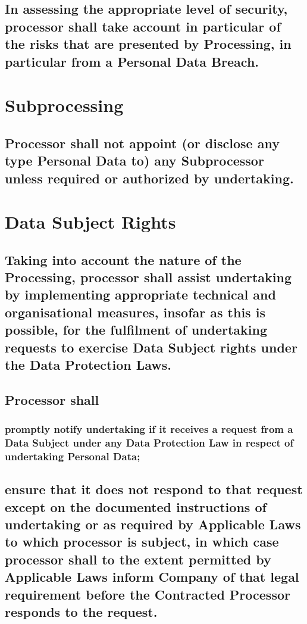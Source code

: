 \documentclass[a4paper]{article}
\begin{document}
\subsection{In assessing the appropriate level of security, \gls{processor} shall take account in particular of the risks that are presented by Processing, in particular from a Personal Data Breach.}

\section{Subprocessing}

\subsection{Processor shall not appoint (or disclose any \gls{type} Personal Data to) any Subprocessor unless required or authorized by \gls{undertaking}.}

\section{Data Subject Rights}

\subsection{Taking into account the nature of the Processing, \gls{processor} shall assist \gls{undertaking} by implementing appropriate technical and organisational measures, insofar as this is possible, for the fulfilment of \gls{undertaking} requests to exercise Data Subject rights under the Data Protection Laws.}

\subsection{Processor shall}

\subsubsection{promptly notify \gls{undertaking} if it receives a request from a Data Subject under any Data Protection Law in respect of \gls{undertaking} Personal Data;}

\subsection*{ensure that it does not respond to that request except on the documented instructions of \gls{undertaking} or as required by Applicable Laws to which \gls{processor} is subject, in which case \gls{processor} shall to the extent permitted by Applicable Laws inform Company of that legal requirement before the Contracted Processor responds to the request.}
\end{document}
